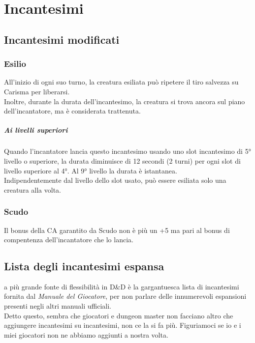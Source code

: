 \chapter{Incantesimi}

\section{Incantesimi modificati}

\subsection{Esilio}
All'inizio di ogni suo turno, la creatura esiliata può ripetere il tiro salvezza su Carisma per liberarsi. \\ Inoltre, durante la durata dell'incantesimo, la creatura si trova ancora sul piano dell'incantatore, ma è considerata trattenuta.
\paragraph{Ai livelli superiori} Quando l'incantatore lancia questo incantesimo usando uno slot incantesimo di 5° livello o superiore, la durata diminuisce di 12 secondi (2 turni) per ogni slot di livello superiore al 4°. Al 9° livello la durata è istantanea. \\ Indipendentemente dal livello dello slot usato, può essere esiliata solo una creatura alla volta.

\subsection{Scudo}
Il bonus della CA garantito da Scudo non è più un +5 ma pari al bonus di compentenza dell'incantatore che lo lancia.

\section{Lista degli incantesimi espansa}

a più grande fonte di flessibilità in D\&D è la gargantuesca lista di incantesimi fornita dal \textit{Manuale del Giocatore}, per non parlare delle innumerevoli espansioni presenti negli altri manuali ufficiali. \\ Detto questo, sembra che giocatori e dungeon master non facciano altro che aggiungere incantesimi su incantesimi, non ce la si fa più. Figuriamoci se io e i miei giocatori non ne abbiamo aggiunti a nostra volta.

